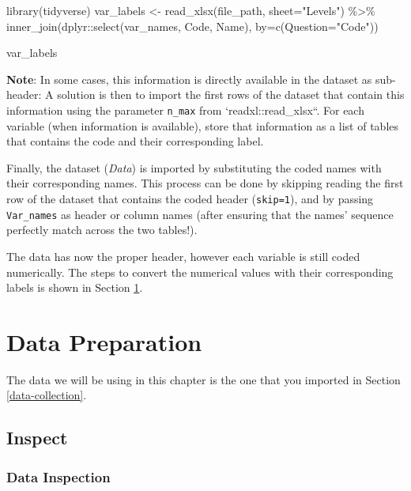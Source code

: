 \documentclass[
]{book}
\newenvironment{Shaded}{\begin{snugshade}}{\end{snugshade}}
\newcommand{\AttributeTok}[1]{\textcolor[rgb]{0.77,0.63,0.00}{#1}}
\newcommand{\FunctionTok}[1]{\textcolor[rgb]{0.00,0.00,0.00}{#1}}
\newcommand{\NormalTok}[1]{#1}
\newcommand{\OtherTok}[1]{\textcolor[rgb]{0.56,0.35,0.01}{#1}}
\newcommand{\SpecialCharTok}[1]{\textcolor[rgb]{0.00,0.00,0.00}{#1}}
\newcommand{\StringTok}[1]{\textcolor[rgb]{0.31,0.60,0.02}{#1}}
\begin{document}
\begin{Shaded}
\begin{Highlighting}[]
\FunctionTok{library}\NormalTok{(tidyverse)}
\NormalTok{var\_labels }\OtherTok{\textless{}{-}} \FunctionTok{read\_xlsx}\NormalTok{(file\_path, }\AttributeTok{sheet=}\StringTok{"Levels"}\NormalTok{) }\SpecialCharTok{\%\textgreater{}\%} 
  \FunctionTok{inner\_join}\NormalTok{(dplyr}\SpecialCharTok{::}\FunctionTok{select}\NormalTok{(var\_names, Code, Name), }\AttributeTok{by=}\FunctionTok{c}\NormalTok{(}\AttributeTok{Question=}\StringTok{"Code"}\NormalTok{))}

\NormalTok{var\_labels}
\end{Highlighting}
\end{Shaded}

\textbf{Note}: In some cases, this information is directly available in the dataset as sub-header: A solution is then to import the first rows of the dataset that contain this information using the parameter \texttt{n\_max} from `readxl::read\_xlsx``. For each variable (when information is available), store that information as a list of tables that contains the code and their corresponding label.

Finally, the dataset (\emph{Data}) is imported by substituting the coded names with their corresponding names.
This process can be done by skipping reading the first row of the dataset that contains the coded header (\texttt{skip=1}), and by passing \texttt{Var\_names} as header or column names (after ensuring that the names' sequence perfectly match across the two tables!).

The data has now the proper header, however each variable is still coded numerically. The steps to convert the numerical values with their corresponding labels is shown in Section \ref{data-prep}.

\hypertarget{data-prep}{%
\chapter{Data Preparation}\label{data-prep}}

The data we will be using in this chapter is the one that you imported in Section \ref{data-collection}.

\hypertarget{inspect-1}{%
\section{Inspect}\label{inspect-1}}

\hypertarget{data-inspection}{%
\subsection{Data Inspection}\label{data-inspection}}
\end{document}
